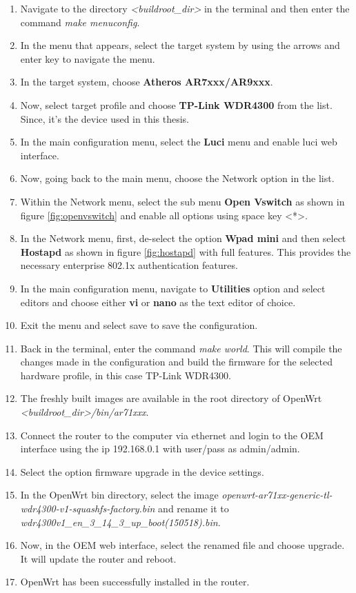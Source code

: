 \begin{enumerate}
	\item Navigate to the directory \textit{<buildroot\_dir>} in the terminal and then enter the command \textit{make menuconfig}.
	\item In the menu that appears, select the target system by using the arrows and enter key to navigate the menu.
	\item In the target system, choose \textbf{Atheros AR7xxx/AR9xxx}.
	\item Now, select target profile and choose \textbf{TP-Link WDR4300} from the list. Since, it's the device used in this thesis.
	\item In the main configuration menu, select the \textbf{Luci} menu and enable luci web interface.
	\item Now, going back to the main menu, choose the Network option in the list.
	\item	Within the Network menu, select the sub menu \textbf{Open Vswitch} as shown in figure  \ref{fig:openvswitch} and enable all options using space key <*>.
	\item	In the Network menu, first, de-select the option \textbf{Wpad mini} and then select \textbf{Hostapd} as shown in figure \ref{fig:hostapd} with full features. This provides the necessary enterprise 802.1x authentication features.
	\item	In the main configuration menu, navigate to \textbf{Utilities} option and select editors and choose either \textbf{vi} or \textbf{nano} as the text editor of choice.
	\item	Exit the menu and select save to save the configuration.
	\item	Back in the terminal, enter the command \textit{make world}. This will compile the changes made in the configuration and build the firmware for the selected hardware profile, in this case TP-Link WDR4300.
	\item	The freshly built images are available in the root directory of OpenWrt \textit{<buildroot\_dir>/bin/ar71xxx}.
	\item	Connect the router to the computer via ethernet and login to the OEM interface using the ip 192.168.0.1 with user/pass as admin/admin.
	\item	Select the option firmware upgrade in the device settings.
	\item	In the OpenWrt bin directory, select the image \textit{openwrt-ar71xx-generic-tl-wdr4300-v1-squashfs-factory.bin} and rename it to 
	\textit{wdr4300v1\_en\_3\_14\_3\_up\_boot(150518).bin}.
	\item	Now, in the OEM web interface, select the renamed file and choose upgrade. It will update the router and reboot.
	\item	OpenWrt has been successfully installed in the router.
	
\end{enumerate}

